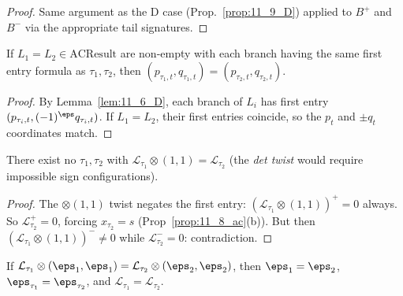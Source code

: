 \begin{lemma}
  \label{prop:11_9_B}
  \leanok
\end{lemma}
\begin{proof}
  \leanok
  Same argument as the D case (Prop.~\ref{prop:11_9_D}) applied to $B^+$ and $B^-$ via the appropriate tail signatures.
\end{proof}


\begin{lemma}
  \label{prop:11_10_D}
  \leanok
  If $L_1 = L_2 \in \mathrm{ACResult}$ are non-empty with each branch having the
  same first entry formula as $\tau_1, \tau_2$, then $(p_{\tau_1, t}, q_{\tau_1, t}) = (p_{\tau_2, t}, q_{\tau_2, t})$.
\end{lemma}
\begin{proof}
  \leanok
  By Lemma~\ref{lem:11_6_D}, each branch of $L_i$ has first entry $(p_{\tau_i, t}, (-1)^{\eps} q_{\tau_i, t})$. If $L_1 = L_2$, their first entries coincide, so the $p_t$ and $\pm q_t$ coordinates match.
\end{proof}


\begin{lemma}
  \label{lem:11_11}
  \leanok
  There exist no $\tau_1, \tau_2$ with $\mathcal{L}_{\tau_1} \otimes (1, 1) = \mathcal{L}_{\tau_2}$ (the \emph{det twist} would require impossible sign configurations).
\end{lemma}

\begin{proof}
  \leanok
  The $\otimes(1, 1)$ twist negates the first entry: $(\mathcal{L}_{\tau_1} \otimes (1, 1))^+ = 0$ always. So $\mathcal{L}_{\tau_2}^+ = 0$, forcing $x_{\tau_2} = s$ (Prop~\ref{prop:11_8_ac}(b)). But then $(\mathcal{L}_{\tau_1} \otimes (1, 1))^- \neq 0$ while $\mathcal{L}_{\tau_2}^- = 0$: contradiction.
\end{proof}

\begin{proposition}
  \label{prop:11_12}
  \leanok
  If $\mathcal{L}_{\tau_1} \otimes (\eps_1, \eps_1) = \mathcal{L}_{\tau_2} \otimes (\eps_2, \eps_2)$,
  then $\eps_1 = \eps_2$, $\eps_{\tau_1} = \eps_{\tau_2}$, and $\mathcal{L}_{\tau_1} = \mathcal{L}_{\tau_2}$.
\end{proposition}

